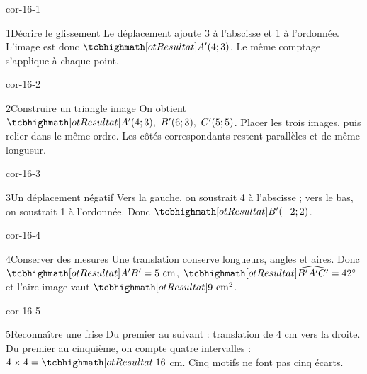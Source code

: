 \clearpage\pagestyle{otMain}\setlength{\otBlocEspacement}{2.5mm}\fontsize{11}{15}\selectfont{}
\begin{blocLivre}{cor-16-1}\begin{corrige}{1}{Décrire le glissement}
Le déplacement ajoute 3 à l’abscisse et 1 à l’ordonnée. L’image est donc $\res{A'(4;3)}$. Le même comptage s’applique à chaque point.
\label{fig-cor-16-1}
\end{corrige}\end{blocLivre}
\begin{blocLivre}{cor-16-2}\begin{corrige}{2}{Construire un triangle image}
On obtient $\res{A'(4;3),\ B'(6;3),\ C'(5;5)}$. Placer les trois images, puis relier dans le même ordre. Les côtés correspondants restent parallèles et de même longueur.
\label{fig-cor-16-2}
\end{corrige}\end{blocLivre}
\begin{blocLivre}{cor-16-3}\begin{corrige}{3}{Un déplacement négatif}
Vers la gauche, on soustrait 4 à l’abscisse ; vers le bas, on soustrait 1 à l’ordonnée. Donc $\res{B'(-2;2)}$.
\label{fig-cor-16-3}
\end{corrige}\end{blocLivre}
\begin{blocLivre}{cor-16-4}\begin{corrige}{4}{Conserver des mesures}
Une translation conserve longueurs, angles et aires. Donc $\res{A'B'=5\ \mathrm{cm}}$, $\res{\widehat{B'A'C'}=42^\circ}$ et l’aire image vaut $\res{9\ \mathrm{cm}^2}$.
\label{fig-cor-16-4}
\end{corrige}\end{blocLivre}
\begin{blocLivre}{cor-16-5}\begin{corrige}{5}{Reconnaître une frise}
Du premier au suivant : translation de 4 cm vers la droite. Du premier au cinquième, on compte quatre intervalles : $4\times4=\res{16}$ cm. Cinq motifs ne font pas cinq écarts.
\label{fig-cor-16-5}
\end{corrige}\end{blocLivre}
